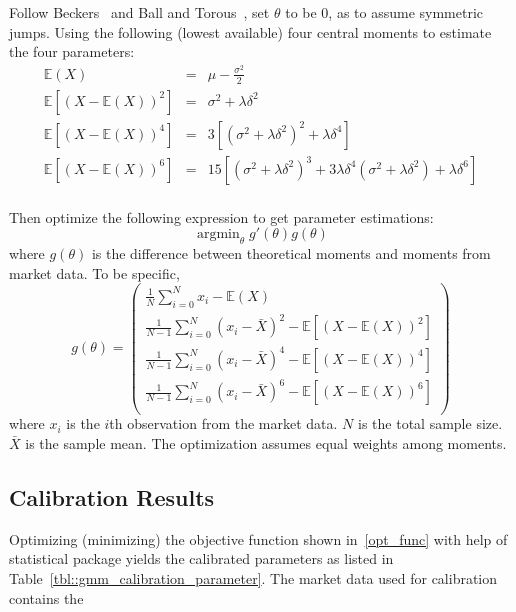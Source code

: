 \documentclass[11pt,reqno,final]{amsart}
\DeclareMathOperator*{\argmin}{arg min}
\begin{document}
Follow Beckers~\cite{B81} and Ball and Torous~\cite{BT85}, set $\theta$ to be 0, as to assume symmetric jumps. Using the following (lowest available) four central moments to estimate the four parameters:
\begin{eqnarray*}
\mathbb{E}(X)                       &=& \mu - \frac{\sigma^2}{2}  \\
\mathbb{E}[(X-\mathbb{E}(X))^{2}]   &=& \sigma^2 + \lambda\delta^2 \\
\mathbb{E}[(X-\mathbb{E}(X))^{4}]   &=& 3[(\sigma^2+\lambda\delta^2)^2+\lambda\delta^4] \\
\mathbb{E}[(X-\mathbb{E}(X))^{6}]   &=& 15[(\sigma^2+\lambda\delta^2)^3 + 3\lambda\delta^4(\sigma^2+\lambda\delta^2)+\lambda\delta^6] \\
\end{eqnarray*}

Then optimize the following expression to get parameter estimations:
\begin{equation} \label{opt_func}
\argmin_{\theta} g'(\theta) g(\theta)
\end{equation}
where $g(\theta)$ is the difference between theoretical moments and moments from market data. To be specific,
$$
g(\theta) = \left(
              \begin{array}{c}
                \frac{1}{N}\sum_{i=0}^N x_{i} - \mathbb{E}(X)  \\
                \frac{1}{N-1}\sum_{i=0}^N(x_{i} - \bar{X})^2 - \mathbb{E}[(X-\mathbb{E}(X))^{2}]  \\
                \frac{1}{N-1}\sum_{i=0}^N(x_{i} - \bar{X})^4 - \mathbb{E}[(X-\mathbb{E}(X))^{4}] \\
                \frac{1}{N-1}\sum_{i=0}^N(x_{i} - \bar{X})^6 - \mathbb{E}[(X-\mathbb{E}(X))^{6}] \\
              \end{array}
            \right)
$$
where $x_i$ is the $i$th observation from the market data. $N$ is the total sample size. $\bar{X}$ is the sample mean. The optimization assumes equal weights among moments.

\subsection{Calibration Results}
Optimizing (minimizing) the objective function shown in~\ref{opt_func} with help of statistical package yields the calibrated parameters as listed in Table~\ref{tbl::gmm_calibration_parameter}. The market data used for calibration contains the
\end{document}
